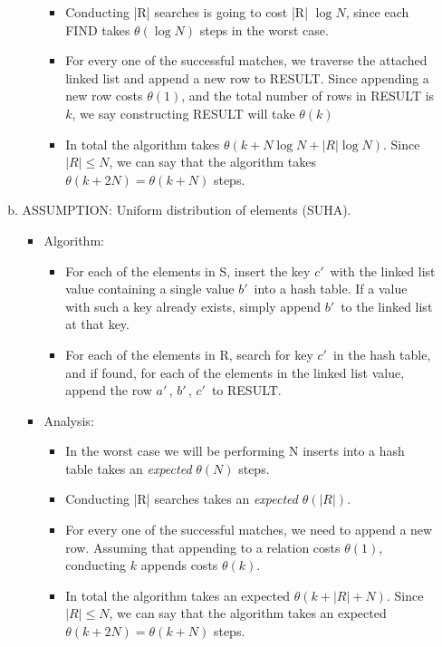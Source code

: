 \documentclass[11pt]{article}
\begin{document}
\begin{enumerate}
\begin{enumerate}[a)]
\begin{itemize}
\begin{itemize}
								\item Conducting |R| searches is going to cost |R| $\log N$, since each FIND takes $\theta(\log N)$ steps in the worst case.

								\item For every one of the successful matches, we traverse the attached linked list and append a new row to RESULT. Since appending a new row costs $\theta(1)$, and the total number of rows in RESULT is $k$, we say constructing RESULT will take $\theta(k)$
								\item In total the algorithm takes $\theta(k + N \log N + |R| \log N).$  Since $|R| \le N$, we can say
that the algorithm takes $\theta(k + 2N) = \theta(k + N) $ steps.
							\end{itemize}
					\end{itemize}
				\item ASSUMPTION: Uniform distribution of elements (SUHA).
					\begin{itemize}
						\item Algorithm:
							\begin{itemize}
								\item For each of the elements in S, insert the key $c'\,\! $ with the linked list value containing a single value $b'\,\! $ into a hash table. If a value with such a key already exists, simply append $b'\,\! $ to the linked list at that key.
								\item For each of the elements in R, search for key $c'\,\! $ in the hash table, and if found, for each of the elements in the linked list value, append the row $a'\,\! $, $b'\,\! $, $c'\,\! $ to RESULT.
							\end{itemize}
						\item Analysis: 
							\begin{itemize}
								\item In the worst case we will be performing N inserts into a hash table takes an \textit{expected} $\theta(N)$ steps.
								\item Conducting |R| searches takes an \textit{expected} $\theta(|R|)$.
								\item For every one of the successful matches, we need to append a new row. Assuming that appending to a relation costs $\theta(1)$, conducting $k$ appends costs $\theta(k)$.
								\item In total the algorithm takes an expected $\theta(k + |R| + N)$. Since $|R| \le N$, we can say
that the algorithm takes an expected $\theta(k + 2N) = \theta(k + N) $ steps.
							\end{itemize}
					\end{itemize}
			\end{enumerate}
	\end{enumerate}
\end{document}
